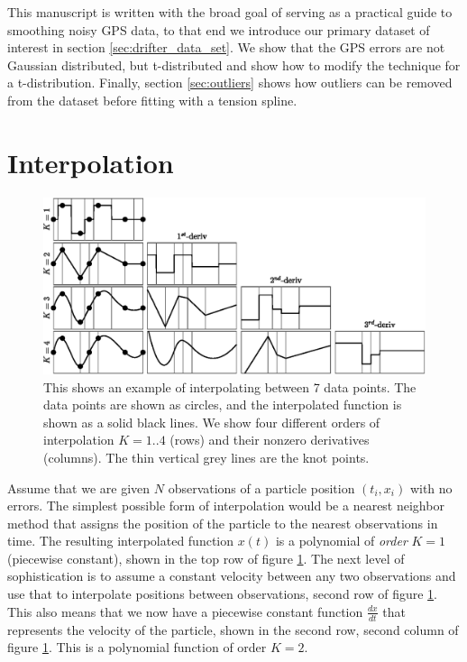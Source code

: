 \documentclass[10pt,journal]{IEEEtran}
\begin{document}
This manuscript is written with the broad goal of serving as a practical guide to smoothing noisy GPS data, to that end we introduce our primary dataset of interest in section \ref{sec:drifter_data_set}. We show that the GPS errors are not Gaussian distributed, but t-distributed and show how to modify the technique for a t-distribution. Finally, section \ref{sec:outliers} shows how outliers can be removed from the dataset before fitting with a tension spline.

%
\section{Interpolation}
\label{sec:interpolation}
%

\begin{figure}[t]
  \centerline{\includegraphics[width=39pc,angle=0]{figures/interpolation}}
  
  \caption{This shows an example of interpolating between 7 data points. The data points are shown as circles, and the interpolated function is shown as a solid black lines. We show four different orders of interpolation $K=1..4$ (rows) and their nonzero derivatives (columns). The thin vertical grey lines are the knot points.}
  \label{interpolation}
\end{figure}

Assume that we are given $N$ observations of a particle position $(t_i,x_i)$ with no errors. The simplest possible form of interpolation would be a nearest neighbor method that assigns the position of the particle to the nearest observations in time. The resulting interpolated function $x(t)$ is a polynomial of \emph{order} $K=1$ (piecewise constant), shown in the top row of figure \ref{interpolation}. The next level of sophistication is to assume a constant velocity between any two observations and use that to interpolate positions between observations, second row of figure \ref{interpolation}. This also means that we now have a piecewise constant function $\frac{dx}{dt}$ that represents the velocity of the particle, shown in the second row, second column of figure  \ref{interpolation}. This is a polynomial function of order $K=2$.
\end{document}
